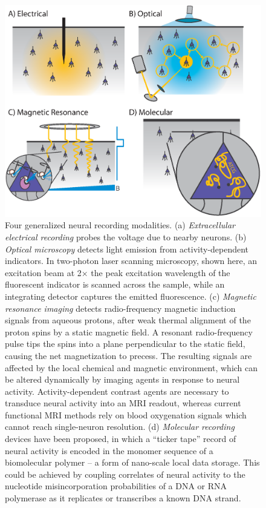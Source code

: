 \begin{figure}[htbp]
\centering
\includegraphics[width=0.8\linewidth]{figs/Fig1.eps}
\caption{Four generalized neural recording modalities. (a) \emph{Extracellular electrical recording} probes the voltage due to nearby neurons. (b) \emph{Optical microscopy} detects light emission from activity-dependent indicators. In two-photon laser scanning microscopy, shown here, an excitation beam at 2$\times$ the peak excitation wavelength of the fluorescent indicator is scanned across the sample, while an integrating detector captures the emitted fluorescence. (c) \emph{Magnetic resonance imaging} detects radio-frequency magnetic induction signals from aqueous protons, after weak thermal alignment of the proton spins by a static magnetic field. A resonant radio-frequency pulse tips the spins into a plane perpendicular to the static field, causing the net magnetization to precess. The resulting signals are affected by the local chemical and magnetic environment, which can be altered dynamically by imaging agents in response to neural activity. Activity-dependent contrast agents are necessary to transduce neural activity into an MRI readout, whereas current functional MRI methods rely on blood oxygenation signals which cannot reach single-neuron resolution. (d) \emph{Molecular recording} devices have been proposed, in which a “ticker tape” record of neural activity is encoded in the monomer sequence of a biomolecular polymer – a form of nano-scale local data storage. This could be achieved by coupling correlates of neural activity to the nucleotide misincorporation probabilities of a DNA or RNA polymerase as it replicates or transcribes a known DNA strand.}  \label{fig:modalities}

\end{figure}

